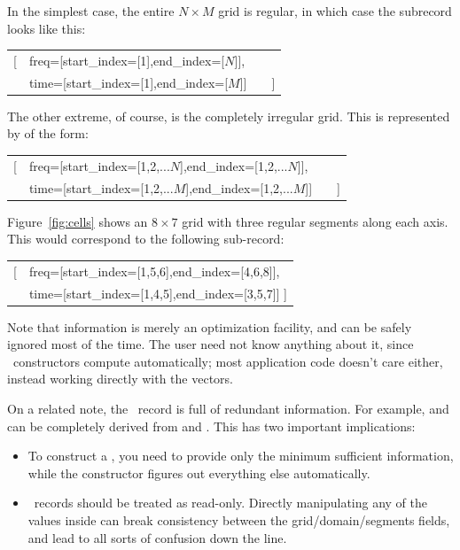   In the simplest case, the entire $N\times M$ grid is regular, in which case the
   subrecord looks like this:
 
  {\tt\begin{center}\begin{tabular}{ll}
  [&freq=[start\_index=[1],end\_index=[$N$]],\\
  &time=[start\_index=[1],end\_index=[$M$]]~~~~]\\
  \end{tabular}\end{center}}
  
  The other extreme, of course, is the completely irregular grid. This is
  represented by  of the form:

  {\tt\begin{center}\begin{tabular}{ll}
  [&freq=[start\_index=[1,2,$...N$],end\_index=[1,2,$...N$]],\\
  &time=[start\_index=[1,2,$...M$],end\_index=[1,2,$...M$]]~~~~]
  \end{tabular}\end{center}}
  
  Figure~\ref{fig:cells} shows an $8\times7$ grid with three regular segments
  along each axis. This would correspond to the following 
  sub-record:

  {\tt\begin{center}\begin{tabular}{ll}
  [&freq=[start\_index=[1,5,6],end\_index=[4,6,8]],\\
   &time=[start\_index=[1,4,5],end\_index=[3,5,7]] ]
  \end{tabular}\end{center}}
  
  Note that  information is merely an optimization facility, and
  can be safely ignored most of the time. The user need not know anything about
  it, since \Cells\ constructors compute  automatically; most
  application code doesn't care either, instead working directly with the
   vectors. 

  On a related note, the \Cells\ record is full of redundant information. For
  example,  and  can be completely derived from
   and . This has two important implications:
  
  \begin{itemize}
  
  \item To construct a \Cells, you need to provide only the minimum sufficient
  information, while the constructor figures out everything else automatically.

  \item \Cells\ records should be treated as read-only. Directly manipulating 
  any of the values inside can break consistency between the
  grid/domain/segments fields, and lead to all sorts of confusion down
  the line.

  \end{itemize}

